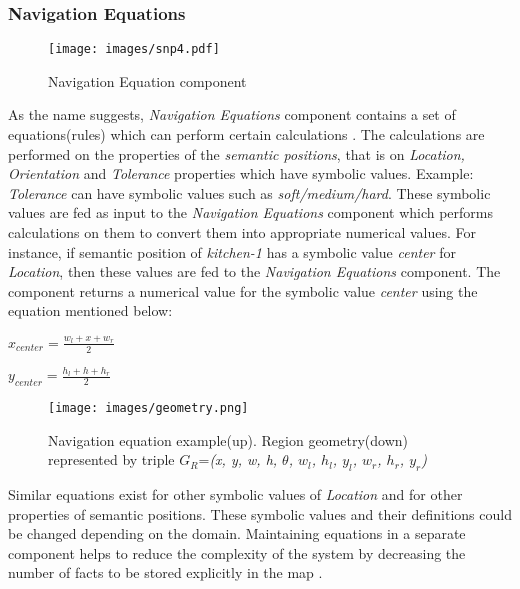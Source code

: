 \subsubsection{Navigation Equations}
\label{sec:ne}
\begin{figure}[htbp]
 \centering
 \texttt{[image: images/snp4.pdf]}
 \caption{Navigation Equation component}
 \label{Fig:Data flow summery}
\end{figure}

As the name suggests, \textit{Navigation Equations} component contains a set of equations(rules) which can perform certain calculations \cite{1,21}.
The calculations are performed on the properties of the \textit{semantic positions}, that is on \textit{Location, Orientation} and \textit{Tolerance}
properties which have symbolic values.
Example: \textit{Tolerance} can have symbolic values such as \textit{soft/medium/hard}.
These symbolic values are fed as input to the \textit{Navigation Equations} component which performs calculations on them
to convert them into appropriate numerical values.
For instance, if semantic position of \textit{kitchen-1} has a symbolic value \textit{center} for \textit{Location}, then 
these values are fed to the \textit{Navigation Equations} component. 
The component returns a numerical value for the symbolic value \textit{center} using the equation mentioned below:\\

\begin{center}
\begin{Large}
$ x_{center} = \frac{ w_{l} + x + w_{r} }{2}$
 
$y_{center} = \frac{ h_{l} + h + h_{r} }{2}$
\end{Large}
\end{center}

 \begin{figure}[htbp]
 \begin{center}
 \texttt{[image: images/geometry.png]}
 \caption[Navigation equation example(up). Region geometry(down) represented by triple \cite{8}]
 {Navigation equation example(up). Region geometry(down) represented by triple $G_{R}$=\textit{(x, y, w, h, $\theta$, $w_{l}$, $h_{l}$, $y_{l}$, $w_{r}$, $h_{r}$, $y_{r}$)} \cite{8}} 
\label{Fig:Data flow summery}
\end{center}
\end{figure}

Similar equations exist for other symbolic values of \textit{Location} and for other properties of semantic positions.
These symbolic values and their definitions could be changed depending on the domain. 
Maintaining equations in a separate component helps to reduce the complexity of the system by decreasing the number of facts to be stored explicitly in the map \cite{1}.
